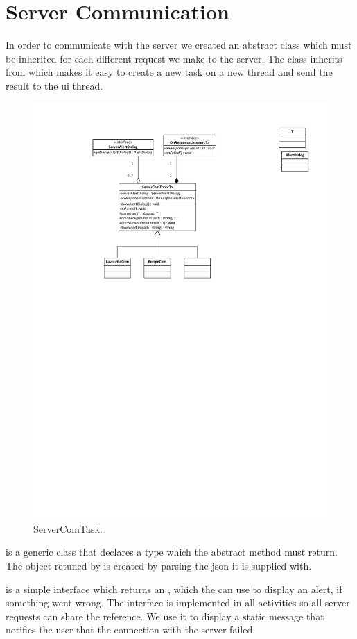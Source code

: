\section{Server Communication}
In order to communicate with the server we created an abstract class which must be inherited for each different request we make to the server. The class inherits from  which makes it easy to create a new task on a new thread and send the result to the \ac{ui} thread.

\begin{figure}[H]
\centering
\includegraphics[width=0.7\linewidth, page=2]{img/servercomtask.pdf}
\caption{ServerComTask.}
\label{fig:servercomtask}
\end{figure}
 is a generic class that declares a type which the abstract method  must return. The object retuned by  is created by parsing the \ac{json} it is supplied with.

 is a simple interface which returns an , which the  can use to display an alert, if something went wrong. The interface is implemented in all activities so all server requests can share the  reference. We use it to display a static message that notifies the user that the connection with the server failed.

